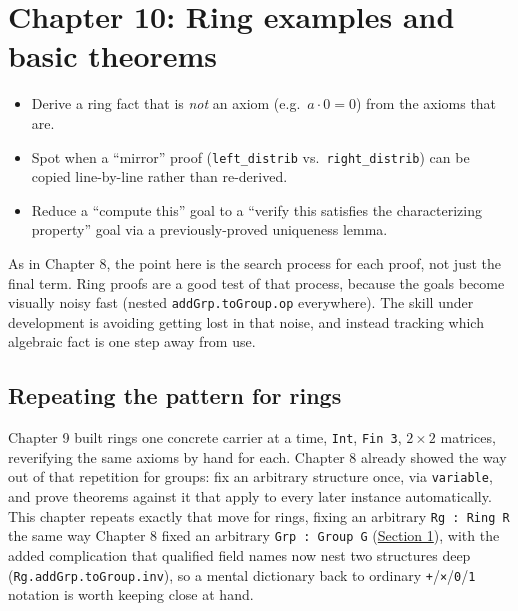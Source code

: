 \chapter{Chapter 10: Ring examples and basic theorems}\label{sec:10-ring-theorems:00-index:1}

\begin{learningobjectives}
\begin{itemize}
\tightlist
\item
  Derive a ring fact that is \emph{not} an axiom (e.g.~\(a\cdot 0=0\)) from the axioms that are.
\item
  Spot when a ``mirror'' proof (\texttt{left\_\allowbreak{}distrib} vs.~\texttt{right\_\allowbreak{}distrib}) can be copied line-by-line rather than re-derived.
\item
  Reduce a ``compute this'' goal to a ``verify this satisfies the characterizing property'' goal via a previously-proved uniqueness lemma.
\end{itemize}
\end{learningobjectives}


As in Chapter 8, the point here is the search process for each proof, not just the final term. Ring proofs are a good test of that process, because the goals become visually noisy fast (nested \texttt{addGrp.toGroup.op} everywhere). The skill under development is avoiding getting lost in that noise, and instead tracking which algebraic fact is one step away from use.

\section{Repeating the pattern for rings}\label{sec:10-ring-theorems:00-index:2}

Chapter 9 built rings one concrete carrier at a time, \texttt{Int}, \texttt{Fin 3}, \(2\times 2\) matrices, reverifying the same axioms by hand for each. Chapter 8 already showed the way out of that repetition for groups: fix an arbitrary structure once, via \texttt{variable}, and prove theorems against it that apply to every later instance automatically. This chapter repeats exactly that move for rings, fixing an arbitrary \texttt{Rg : Ring R} the same way Chapter 8 fixed an arbitrary \texttt{Grp : Group G} (\hyperref[sec:10-ring-theorems:01-setup:1]{Section 1}), with the added complication that qualified field names now nest two structures deep (\texttt{Rg.addGrp.toGroup.inv}), so a mental dictionary back to ordinary \texttt{+}/\texttt{×}/\texttt{0}/\texttt{1} notation is worth keeping close at hand.

